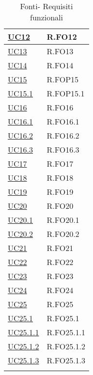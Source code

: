 \begin{longtable}{|P{4,5cm}|>{\arraybackslash}P{9cm}|}
  \hline
  \hyperref[UC12]{UC12} & R.FO12 \\
  \hline
  \hyperref[UC13]{UC13} & R.FO13 \\
  \hline
  \hyperref[UC14]{UC14} & R.FO14 \\
  \hline
  \hyperref[UC15]{UC15} & R.FOP15 \\
  \hline
  \hyperref[UC15point1]{UC15.1} & R.FOP15.1 \\
  \hline
  \hyperref[UC16]{UC16} & R.FO16 \\
  \hline
  \hyperref[UC16point1]{UC16.1} & R.FO16.1 \\
  \hline
  \hyperref[UC16point2]{UC16.2} & R.FO16.2 \\
  \hline
  \hyperref[UC16point3]{UC16.3} & R.FO16.3 \\
  \hline
  \hyperref[UC17]{UC17} & R.FO17 \\
  \hline
  \hyperref[UC18]{UC18} & R.FO18 \\
  \hline
  \hyperref[UC19]{UC19} & R.FO19 \\
  \hline
  \hyperref[UC20]{UC20} & R.FO20 \\
  \hline
  \hyperref[UC20point1]{UC20.1} & R.FO20.1 \\
  \hline
  \hyperref[UC20point2]{UC20.2} & R.FO20.2 \\
  \hline
  \hyperref[UC21]{UC21} & R.FO21 \\
  \hline
  \hyperref[UC22]{UC22} & R.FO22 \\
  \hline
  \hyperref[UC23]{UC23} & R.FO23 \\
  \hline
  \hyperref[UC24]{UC24} & R.FO24 \\
  \hline
  \hyperref[UC25]{UC25} & R.FO25 \\
  \hline
  \hyperref[UC25point1]{UC25.1} & R.FO25.1 \\
  \hline
  \hyperref[UC25point1point1]{UC25.1.1} & R.FO25.1.1 \\
  \hline
  \hyperref[UC25poin1point2]{UC25.1.2} & R.FO25.1.2 \\
  \hline
  \hyperref[UC25poin1point3]{UC25.1.3} & R.FO25.1.3 \\
  \hline
\caption{Fonti- Requisiti funzionali}
\end{longtable}
